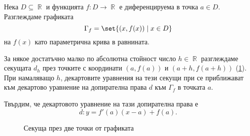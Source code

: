 \documentclass{../../common/topic}
\begin{document}
\bigskip
\begin{minipage}{0.45\textwidth}
  \begin{theorem}
    Нека \( D \subseteq \BbbR \) и функцията \( f: D \to \BbbR \) е диференцируема в точка \( a \in D \). Разглеждаме графиката
    \begin{equation*}
      \Gamma_f = \set{ (x, f(x)) \mid x \in D }
    \end{equation*}
    на \( f(x) \) като параметрична крива в равнината.

    За някое достатъчно малко по абсолютна стойност число \( h \in \BbbR \) разглеждаме секущата \( d_h \) през точките с координати \( (a, f(a)) \) и \( (a+h, f(a+h)) \) (\cref{fig:secant}). При намаляващо \( h \), декартовите уравнения на тези секущи при се приближават към декартово уравнение на допирателна права \( d \) към \( \Gamma_f \) в точката \( a \).

    Твърдим, че декартовото уравнение на тази допирателна права е
    \begin{equation*}
      d: y = f'(a) (x-a) + f(a).
    \end{equation*}
  \end{theorem}
\end{minipage}
\hspace{0.5cm}
\begin{minipage}{0.45\textwidth}
  \begin{figure}[H]
    \centering
    \caption{Секуща през две точки от графиката}\label{fig:secant}
  \end{figure}
\end{minipage}
\end{document}
